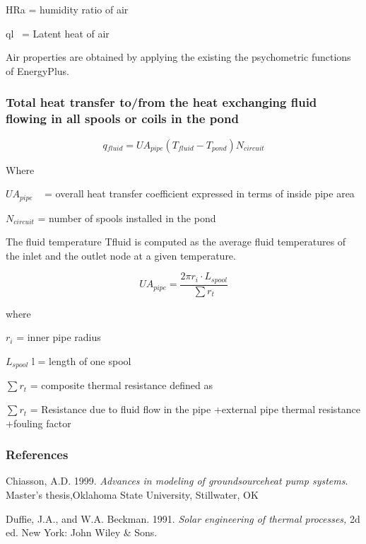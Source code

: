 HRa = humidity ratio of air

ql~ = Latent heat of air

Air properties are obtained by applying the existing the psychometric functions of EnergyPlus.

\subsubsection{Total heat transfer to/from the heat exchanging fluid flowing in all spools or coils in the pond}\label{total-heat-transfer-tofrom-the-heat-exchanging-fluid-flowing-in-all-spools-or-coils-in-the-pond}

\begin{equation}
q{}_{fluid} = UA{}_{pipe}(T{}_{fluid} - T{}_{pond})N{}_{circuit}
\end{equation}

Where

\(UA{}_{pipe}\) ~ = overall heat transfer coefficient expressed in terms of inside pipe area

\(N{}_{circuit}\) = number of spools installed in the pond

The fluid temperature Tfluid is computed as the average fluid temperatures of the inlet and the outlet node at a given temperature.

\begin{equation}
U{A_{pipe}} = \frac{{2\pi {r_i}\cdot {L_{spool}}}}{{\sum {{r_t}} }}
\end{equation}

where

\({r_i}\) = inner pipe radius

\({L_{spool}}\) l = length of one spool

\(\sum {{r_t}}\) = composite thermal resistance defined as

\(\sum {{r_t}}\) = Resistance due to fluid flow in the pipe +external pipe thermal resistance +fouling factor

\subsubsection{References}\label{references-4-002}

Chiasson, A.D. 1999. \emph{Advances in modeling of groundsourceheat pump systems}. Master's thesis,Oklahoma State University, Stillwater, OK

Duffie, J.A., and W.A. Beckman. 1991. \emph{Solar engineering of thermal processes,} 2d ed. New York: John Wiley \& Sons.

